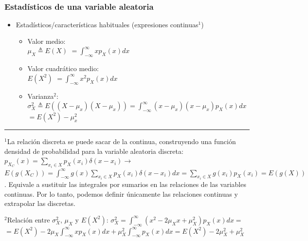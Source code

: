 \begin{frame}\frametitle{Estadísticos de una variable aleatoria}
  \footnotesize

  \begin{itemize}
    \item Estadísticos/características habituales (expresiones continuas$^1$)

    \begin{itemize}\footnotesize
      \item \alert{Valor medio}:\\\vspace{0.1cm}$\mu_X \triangleq E(X)$ $=\int_{-\infty}^{\infty}x p_X(x)dx$
      \item \alert{Valor cuadrático medio:}\\\vspace{0.1cm}$E(X^2)$ $=\int_{-\infty}^{\infty}x^2 p_X(x)dx$
      \item \alert{Varianza$^2$:}\\\vspace{0.1cm}$\sigma^2_X \triangleq E((X-\mu_x)(X-\mu_x))=\int_{-\infty}^{\infty}(x-\mu_x)(x-\mu_x) p_X(x)dx$ $=E(X^2)-\mu_x^2$
    \end{itemize}

  \end{itemize}


  \rule{11cm}{0.04ex}
  \scriptsize
  $^1$La relación discreta se puede sacar de la continua, construyendo una función densidad de probabilidad para la variable aleatoria discreta:  $p_{X_C}(x)=\sum_{x_i \in X} p_X(x_i)\delta(x-x_i) \rightarrow$
  $E(g(X_C))\!=\!\int_{-\infty}^{\infty}\!g(x)\! \sum_{x_i \in X} p_X(x_i)\delta(x\!-\!x_i)dx\!=\!\sum_{x_i \in X} g(x_i)p_X(x_i)=E(g(X))$. Equivale a sustituir las integrales por sumarios en las relaciones de las variables continuas. Por lo tanto, podemos definir únicamente las relaciones continuas y extrapolar las discretas.

  \vspace{0.2cm}

  $^2$Relación entre $\sigma^2_X$, $\mu_X$ y $E(X^2)$:  $\sigma^2_X\!=\!\! \int_{-\infty}^{\infty}\!\!(x^2\!-\!2 \mu_X x\!+\! \mu_X^2) p_X(x)dx=$ $=E(X^2)-2\mu_X \int_{-\infty}^{\infty}x p_X(x)dx+ \mu_X^2  \int_{-\infty}^{\infty}p_X(x)dx=E(X^2)-2\mu_X^2+\mu_X^2 $

\end{frame}

